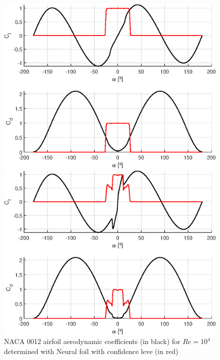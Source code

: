 \begin{figure}[!htb]
	\centering
	\begin{minipage}{0.3\textwidth}
		\centering
		\includegraphics[width=\textwidth]{Figures/background/aero/aero_model_1e4.eps}
		\caption[NACA 0012 airfoil aerodynamic coefficients for $Re=10^4$ determined with Neural foil with confidence level]{NACA 0012 airfoil aerodynamic coefficients (in black) for $Re=10^4$ determined with Neural foil with confidence leve (in red)}
		\label{fig:aero_model_1e4}
	\end{minipage}
	\hfill
	\begin{minipage}{0.3\textwidth}
		\centering
		\includegraphics[width=\textwidth]{Figures/background/aero/aero_model_1e5.eps}

\end{minipage}
\end{figure}
